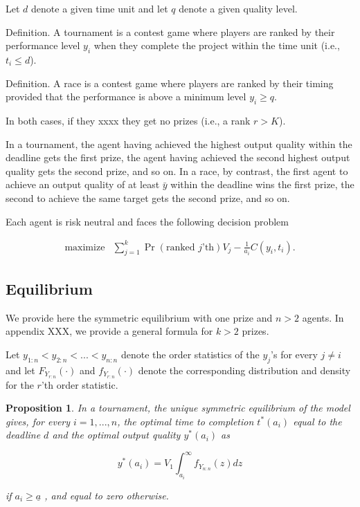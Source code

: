 \documentclass[12pt,]{article}
\newtheorem{proposition}{Proposition}
\begin{document}
Let \(d\) denote a given time unit and let \(q\) denote a given quality
level.

Definition. A tournament is a contest game where players are ranked by
their performance level \(y_i\) when they complete the project within
the time unit (i.e., \(t_i \leq d\)).

Definition. A race is a contest game where players are ranked by their
timing provided that the performance is above a minimum level
\(y_i\geq q\).

In both cases, if they xxxx they get no prizes (i.e., a rank \(r > K\)).

In a tournament, the agent having achieved the highest output quality
within the deadline gets the first prize, the agent having achieved the
second highest output quality gets the second prize, and so on. In a
race, by contrast, the first agent to achieve an output quality of at
least \({\bar y}\) within the deadline wins the first prize, the second
to achieve the same target gets the second prize, and so on.

Each agent is risk neutral and faces the following decision problem

\[\begin{array}{ll}
    \mbox{maximize} & \sum_{j=1}^k \Pr(\text{ranked $j$'th}) V_j  - \frac{1}{a_i} C(y_i, t_i).
  \end{array}\]

\subsection{Equilibrium}\label{equilibrium}

We provide here the symmetric equilibrium with one prize and \(n>2\)
agents. In appendix XXX, we provide a general formula for \(k>2\)
prizes.

Let \(y_{1:n} < y_{2:n} < ... < y_{n:n}\) denote the order statistics of
the \(y_j\)'s for every \(j\neq i\) and let \({F_{Y_{r:n}}}(\cdot)\) and
\({f_{Y_{r:n}}}(\cdot)\) denote the corresponding distribution and
density for the \(r\)'th order statistic.

\begin{proposition}

In a tournament, the unique symmetric equilibrium of the model gives,
for every \(i=1, ..., n\), the optimal time to completion \(t^*(a_i)\)
equal to the deadline \(d\) and the optimal output quality \(y^*(a_i)\)
as

\[\label{eq: optimal bid tournament}
  y^*(a_i) =  V_1 \int_{a_i}^\infty {f_{Y_{n:n}}} (z) dz\]

if \({a_i}\geq {\underline a}\) \citep[see][]{moldovanu2001optimal}, and
equal to zero otherwise.

\end{proposition}
\end{document}
